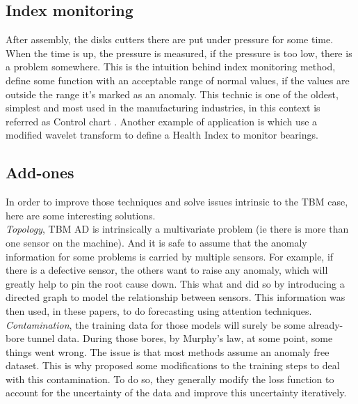 \documentclass[../../main/main.tex]{subfiles}
\begin{document}
    \subsection{Index monitoring}\label{subsec:indexing}
        After assembly, the disks cutters there are put under pressure for some time. When the time is up, the 
        pressure is measured, if the pressure is too low, there is a problem somewhere. This is the intuition behind index 
        monitoring method, define some function with an acceptable range of normal values, if the values are outside the range 
        it's marked as an anomaly. This technic is one of the oldest, simplest and most used in the manufacturing industries, in
        this context is referred as Control chart \cite{Saleh.01.10.2021}. Another example of application is \cite{Jin.2016} which 
        use a modified wavelet transform to define a Health Index to monitor bearings. 
    
    \subsection{Add-ones}\label{subsec:add_ons}
        In order to improve those techniques and solve issues intrinsic to the TBM case, here are some interesting solutions.\\
        \textit{Topology}, TBM AD is intrinsically a multivariate problem (ie there is more than one sensor on the machine).
        And it is safe to assume that the anomaly information for some problems is carried by multiple sensors. For example, if there 
        is a defective sensor, the others want to raise any anomaly, which will greatly help to pin the root cause down. This what 
        \cite{Deng.2021} and \cite{Chen.2021} did so by introducing a directed graph to model the relationship between sensors. This information 
        was then used, in these papers, to do forecasting using attention techniques.\\
        
        \textit{Contamination}, the training data for those models will surely be some already-bore tunnel data. 
        During those bores, by Murphy's law, at some point, some things went wrong. The issue is that most methods assume an anomaly
        free dataset. This is why \cite{Kim.2023} \cite{ChenQiu.2022} \cite{Shang.2023} proposed some modifications to the training steps to deal with this 
        contamination. To do so, they generally modify the loss function to account for the uncertainty of the data and improve 
        this uncertainty iteratively. 
        \\
    
\end{document}
